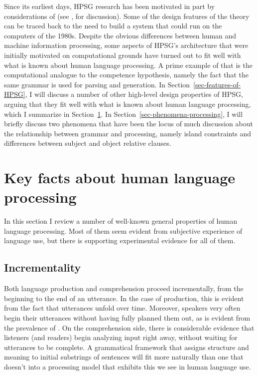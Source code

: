 \documentclass[output=paper
                ,modfonts
                ,nonflat
	        ,collection
	        ,collectionchapter
	        ,collectiontoclongg
 	        ,biblatex
                ,babelshorthands
                ,newtxmath
                ,draftmode
                ,colorlinks, citecolor=brown
]{./langsci/langscibook}
\begin{document}
Since its earliest days, HPSG research has been motivated in part by considerations of  (see , for discussion).  Some of the design features of the theory can be traced back to the need to build a system that could run on the computers of the 1980s.  Despite the obvious differences between human and machine information processing, some aspects of HPSG's architecture that were initially motivated on computational grounds have turned out to fit well with what is known about human language processing.  A prime example of that is the computational analogue to the competence hypothesis, namely the fact that the same grammar is used for parsing and generation. In Section~\ref{sec-features-of-HPSG}, I will discuss a number of other high-level design properties of HPSG, arguing that they fit well with what is known about human language processing, which I summarize in Section~\ref{sec-key-facts}.  In Section~\ref{sec-phenomena-processing}, I will briefly discuss two phenomena that have been the locus of much discussion about the relationship between grammar and processing, namely island constraints and differences between subject and object relative clauses.

\section{Key facts about human language processing}
\label{sec-key-facts}

In this section I review a number of well-known general properties of human language processing.  Most of them seem evident from subjective experience of language use, but there is supporting experimental evidence for all of them.  

\subsection{Incrementality}

Both language production and comprehension proceed incrementally, from the beginning to the end of an utterance.  In the case of production, this is evident from the fact that utterances unfold over time.  Moreover, speakers very often begin their utterances without having fully planned them out, as is evident from the prevalence of .  On the comprehension side, there is considerable evidence that listeners (and readers) begin analyzing input right away, without waiting for utterances to be complete.  A grammatical framework that assigns structure and meaning to initial substrings of sentences will fit more naturally than one that doesn't into a processing model that exhibits this  we see in human language use.  
\end{document}
